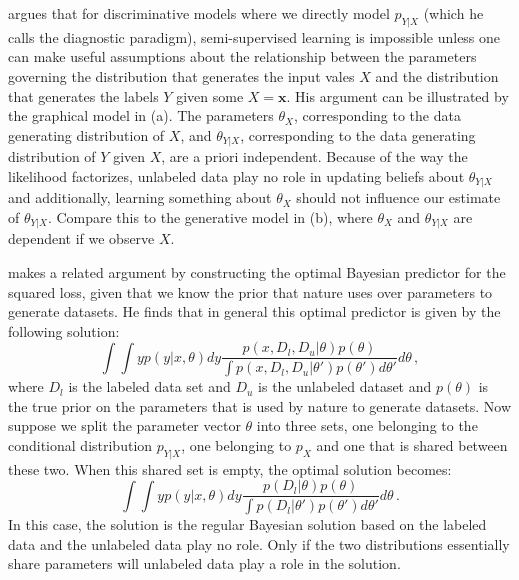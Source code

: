 \documentclass[twoside]{memoir}\usepackage[]{graphicx}\usepackage{xcolor}
\begin{document}
\citet{Seeger2001} argues that for discriminative models where we directly model $p_{Y|X}$ (which he calls the diagnostic paradigm), semi-supervised learning is impossible unless one can make useful assumptions about the relationship between the parameters governing the distribution that generates the input vales $X$ and the distribution that generates the labels $Y$ given some $X=\mathbf{x}$. His argument can be illustrated by the graphical model in (a). The parameters $\theta_X$, corresponding to the data generating distribution of $X$, and $\theta_{Y|X}$, corresponding to the data generating distribution of $Y$ given $X$, are a priori independent. Because of the way the likelihood factorizes, unlabeled data play no role in updating beliefs about $\theta_{Y|X}$ and additionally, learning something about $\theta_X$ should not influence our estimate of $\theta_{Y|X}$. Compare this to the generative model in (b), where $\theta_X$ and $\theta_{Y|X}$ are dependent if we observe $X$.

\citet{Hansen2009} makes a related argument by constructing the optimal Bayesian predictor for the squared loss, given that we know the prior that nature uses over parameters to generate datasets. He finds that in general this optimal predictor is given by the following solution:
\begin{equation}
\int \int y p(y|x,\theta) d y \frac{p(x,D_l,D_u|\theta) p(\theta)}{\int p(x,D_l,D_u|\theta') p(\theta') d\theta'} d \theta \,, \nonumber
\end{equation}
where $D_l$ is the labeled data set and $D_u$ is the unlabeled dataset and $p(\theta)$ is the true prior on the parameters that is used by nature to generate datasets. Now suppose we split the parameter vector $\theta$ into three sets, one belonging to the conditional distribution $p_{Y|X}$, one belonging to $p_{X}$ and one that is shared between these two. When this shared set is empty, the optimal solution becomes:
\begin{equation}
\int \int y p(y|x,\theta) d y \frac{p(D_l|\theta) p(\theta)}{\int p(D_l|\theta') p(\theta') d\theta'} d \theta \,. \nonumber
\end{equation}
In this case, the solution is the regular Bayesian solution based on the labeled data and the unlabeled data play no role. Only if the two distributions essentially share parameters will unlabeled data play a role in the solution.
\end{document}
